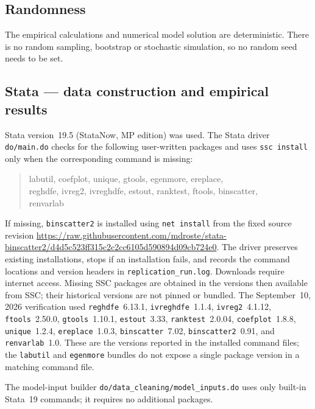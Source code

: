 \documentclass[11pt]{article}
\newcommand{\pkgfile}[1]{\nolinkurl{#1}}
\begin{document}
\subsection*{Randomness}

The empirical calculations and numerical model solution are
deterministic. There is no random sampling, bootstrap or stochastic
simulation, so no random seed needs to be set.

\subsection*{Stata --- data construction and empirical results}

Stata version~19.5 (StataNow, MP edition) was used. The Stata driver
\pkgfile{do/main.do} checks for the following user-written packages and
uses \texttt{ssc install} only when the corresponding command is missing:

\begin{quote}\ttfamily
labutil, coefplot, unique, gtools, egenmore, ereplace,\\
reghdfe, ivreg2, ivreghdfe, estout, ranktest, ftools, binscatter,\\
renvarlab
\end{quote}

If missing, \texttt{binscatter2} is installed using \texttt{net install}
from the fixed source revision
\url{https://raw.githubusercontent.com/mdroste/stata-binscatter2/d4d5c523ff315c2c2cc6105d590894d09cb724e0}.
The driver preserves existing installations, stops if an installation fails,
and records the command locations and version headers in
\pkgfile{replication_run.log}. Downloads require internet access. Missing
SSC packages are obtained in the versions then available from SSC; their
historical versions are not pinned or bundled. The September~10, 2026 verification used \texttt{reghdfe}~6.13.1,
\texttt{ivreghdfe}~1.1.4, \texttt{ivreg2}~4.1.12, \texttt{ftools}~2.50.0,
\texttt{gtools}~1.10.1, \texttt{estout}~3.33, \texttt{ranktest}~2.0.04,
\texttt{coefplot}~1.8.8, \texttt{unique}~1.2.4, \texttt{ereplace}~1.0.3,
\texttt{binscatter}~7.02, \texttt{binscatter2}~0.91,
and \texttt{renvarlab}~1.0.
These are the versions reported in the installed command files; the
\texttt{labutil} and \texttt{egenmore} bundles do not expose a single
package version in a matching command file.

The model-input builder \pkgfile{do/data_cleaning/model_inputs.do} uses
only built-in Stata~19 commands; it requires no additional packages.
\end{document}
